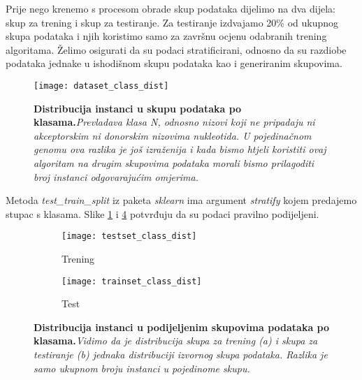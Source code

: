 Prije nego krenemo s procesom obrade skup podataka dijelimo na dva dijela: skup za trening i skup za testiranje. Za testiranje izdvajamo 20\% od ukupnog skupa podataka i njih koristimo samo za završnu ocjenu odabranih trening algoritama. Želimo osigurati da su podaci stratificirani, odnosno da su razdiobe podataka jednake u ishodišnom skupu podataka kao i generiranim skupovima. 
\begin{center}
   \begin{figure}[ht!]
      \begin{center}
         \texttt{[image: dataset\_class\_dist]}
         \caption[Distribucija instanci u skupu podataka]
         {\textbf{Distribucija instanci u skupu podataka po klasama.}\textit{Prevladava klasa N, odnosno nizovi koji ne pripadaju ni akceptorskim ni donorskim nizovima nukleotida. U pojedinačnom genomu ova razlika je još izraženija\cite{Brown01} i kada bismo htjeli koristiti ovaj algoritam na drugim skupovima podataka morali bismo prilagoditi broj instanci odgovarajućim omjerima.}}
         \label{fig:dist_orig}
      \end{center}
   \end{figure}
\end{center}

Metoda \textit{test{\_}train{\_}split} iz paketa \textit{sklearn} ima argument \textit{stratify} kojem predajemo stupac s klasama. Slike \ref{fig:dist_orig} i \ref{fig:dist_train_test} potvrđuju da su podaci pravilno podijeljeni.

\begin{center}
   \begin{figure}[ht!]
   \begin{subfigure}{.5\textwidth}
         \texttt{[image: testset\_class\_dist]}
         \caption{Trening}
         \label{fig:dist_train}
   \end{subfigure}
   \begin{subfigure}{.5\textwidth}
         \texttt{[image: trainset\_class\_dist]}
         \caption{Test}
         \label{fig:dist_test}
   \end{subfigure}
   \caption[Distribucija instanci u trening i testnom skupu podataka]
   {\textbf{Distribucija instanci u podijeljenim skupovima podataka po klasama.}\textit{Vidimo da je distribucija skupa za trening (a) i skupa za testiranje (b) jednaka distribuciji izvornog skupa podataka. Razlika je samo ukupnom broju instanci u pojedinome skupu.}}
    \label{fig:dist_train_test}
   \end{figure}
\end{center}

